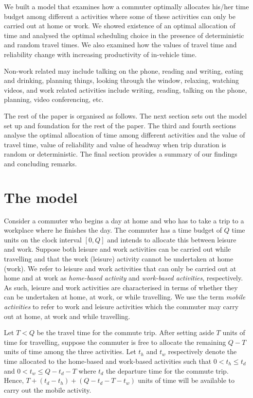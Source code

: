 \documentclass[12pt,a4paper,british]{article}
\begin{document}
We built a model that examines how a commuter optimally allocates his/her time budget among different a activities where some of these activities can only be carried out at home or work. We showed existence of an optimal allocation of time and analysed the optimal scheduling choice in the presence of deterministic and random travel times. We also examined how the values of travel time and reliability change with increasing productivity of in-vehicle time.

Non-work related may include talking on the phone, reading and writing, eating and drinking, planning things, looking through the window, relaxing, watching videos,
and work related activities include writing, reading, talking on the phone, planning, video conferencing, etc.

The rest of the paper is organised as follows. The next section sets out the model set up and foundation for the rest of the paper. The third and fourth sections analyse the optimal allocation of time among different activities and the value of travel time, value of reliability and value of headway when trip duration is random or deterministic. The final section provides a summary of our findings and concluding remarks.

\section{The model}
\label{sec:model1}

Consider a commuter who begins a day at home and who has to take a trip to a workplace where he finishes the day. The commuter has a time budget of $Q$ time units on the clock interval $[0, Q]$ and intends to allocate this between leisure and work. Suppose both leisure and work activities can be carried out while travelling and that the work (leisure) activity cannot be undertaken at home (work). We refer to leisure and work activities that can only be carried out at home and at work as \emph{home-based activity} and \emph{work-based activities}, respectively. As such, leisure and work activities are characterised in terms of whether they can be undertaken at home, at work, or while travelling. We use the term \textit{mobile activities} to refer to work and leisure activities which the commuter may carry out at home, at work and while travelling.

Let $T<Q$ be the travel time for the commute trip. After setting aside $T$ units of time for travelling, suppose the commuter is free to allocate the remaining $Q-T$ units of time among the three activities. Let $t_{h}$ and $t_{w}$ respectively denote the time allocated to the home-based and work-based activities such that $0<t_{h}\leq t_{d}$ and $0<t_{w}\leq Q-t_{d}-T$ where $t_d$ the departure time for the commute trip. Hence,  $T+\left(t_{d}-t_{h}\right)+\left(Q-t_{d}-T-t_{w}\right)$ units of time will be available to carry out the mobile activity. 
\end{document}
